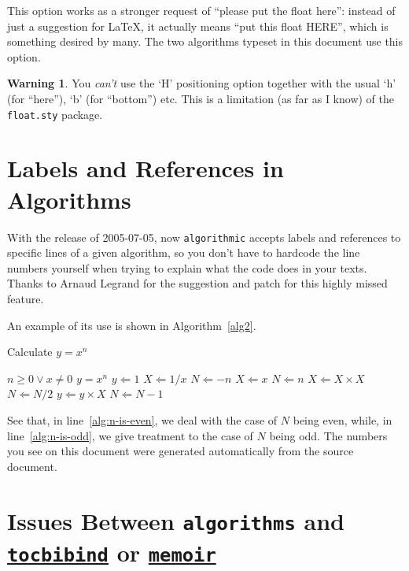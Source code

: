 \documentclass[letterpaper]{article}
\newcommand{\keyword}[1]{\texttt{#1}}
\begin{document}
This option works as a stronger request of ``please put the float
here'': instead of just a suggestion for \LaTeX, it actually means ``put
this float HERE'', which is something desired by many. The two
algorithms typeset in this document use this option.

\theoremstyle{definition}
\newtheorem*{warning*}{Warning}

\medskip
\begin{warning*}
  You \emph{can't} use the `H' positioning option together with the
  usual `h' (for ``here''), `b' (for ``bottom'') etc. This is a
  limitation (as far as I know) of the \texttt{float.sty} package.
\end{warning*}

\section[References in Algorithms]%
{Labels and References in Algorithms}

With the release of 2005-07-05, now \keyword{algorithmic} accepts labels
and references to specific lines of a given algorithm, so you don't have
to hardcode the line numbers yourself when trying to explain what the
code does in your texts.  Thanks to Arnaud Legrand for the suggestion
and patch for this highly missed feature.

An example of its use is shown in Algorithm~\ref{alg2}.
\begin{algorithm}[H]
  \caption{Calculate $y = x^n$}
  \label{alg2}
  \begin{algorithmic}[1]
    \REQUIRE $n \geq 0 \vee x \neq 0$
    \ENSURE $y = x^n$
    \STATE $y \Leftarrow 1$
    \STATE $X \Leftarrow 1 / x$
    \STATE $N \Leftarrow -n$
    \ELSE
    \STATE $X \Leftarrow x$
    \STATE $N \Leftarrow n$
    \ENDIF
    \label{alg:n-is-even}
    \STATE $X \Leftarrow X \times X$
    \STATE $N \Leftarrow N / 2$
    \ELSE\label{alg:n-is-odd}
    \STATE $y \Leftarrow y \times X$
    \STATE $N \Leftarrow N - 1$
    \ENDIF
    \ENDWHILE
  \end{algorithmic}
\end{algorithm}
See that, in line~\ref{alg:n-is-even}, we deal with the case of $N$
being even, while, in line~\ref{alg:n-is-odd}, we give treatment to the
case of $N$ being odd. The numbers you see on this document were
generated automatically from the source document.


\section[Known Issues]{Issues Between \texttt{algorithms} and
  \href{http://www.ctan.org/tex-archive/help/Catalogue/entries/tocbibind.html}{\texttt{tocbibind}}
  or \href{http://www.ctan.org/tex-archive/help/Catalogue/entries/memoir.html}{\texttt{memoir}}}
\end{document}
